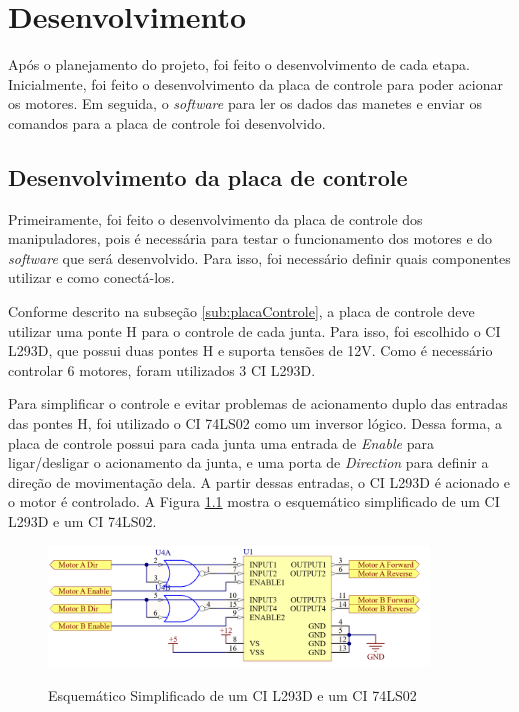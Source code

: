 \chapter[Desenvolvimento]{Desenvolvimento}
\label{cap:desenvolvimento}

Após o planejamento do projeto, foi feito o desenvolvimento de cada etapa.
Inicialmente, foi feito o desenvolvimento da placa de controle para poder acionar os motores.
Em seguida, o \textit{software} para ler os dados das manetes e enviar os comandos para a placa de controle foi desenvolvido.

\section[Desenvolvimento da placa de controle]{Desenvolvimento da placa de controle}
\label{sec:desenvolvimentoPlacaControle}

Primeiramente, foi feito o desenvolvimento da placa de controle dos manipuladores, pois é necessária para testar o funcionamento dos motores e do \textit{software} que será desenvolvido.
Para isso, foi necessário definir quais componentes utilizar e como conectá-los.

Conforme descrito na subseção \ref{sub:placaControle}, a placa de controle deve utilizar uma ponte H para o controle de cada junta.
Para isso, foi escolhido o CI L293D, que possui duas pontes H e suporta tensões de 12V.
Como é necessário controlar 6 motores, foram utilizados 3 CI L293D.

Para simplificar o controle e evitar problemas de acionamento duplo das entradas das pontes H, foi utilizado o CI 74LS02 como um inversor lógico.
Dessa forma, a placa de controle possui para cada junta uma entrada de \textit{Enable} para ligar/desligar o acionamento da junta, e uma porta de \textit{Direction} para definir a direção de movimentação dela.
A partir dessas entradas, o CI L293D é acionado e o motor é controlado.
A Figura \ref{fig:esquematicoSimplificado} mostra o esquemático simplificado de um CI L293D e um CI 74LS02.

\begin{figure}[H]
    \centering
    \caption{Esquemático Simplificado de um CI L293D e um CI 74LS02}
    \includegraphics[keepaspectratio=true, width=0.9\textwidth]
    	{img/placa-controle-esquematico-simplificado.png}
    \label{fig:esquematicoSimplificado}
\end{figure}

